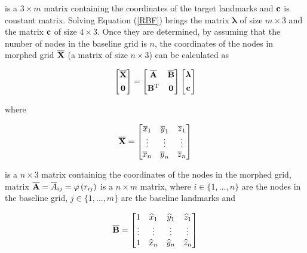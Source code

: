 is a $3\times m$ matrix containing the coordinates of the target landmarks and ${\bf c}$ is constant matrix. Solving Equation (\ref{RBF}) brings the matrix $\bm\lambda$ of size $m\times 3$ and the matrix ${\bf c}$ of size $4\times 3$. Once they are determined, by assuming that the number of nodes in the baseline grid is $n$, the coordinates of the nodes in morphed grid $\overline{\bf X}$ (a matrix of size $n\times 3$) can be calculated as

\begin{equation}
\left[\begin{matrix}
\overline{\bf X}\\[1ex]
{\bf 0}
\end{matrix}\right]
=
\left[\begin{matrix}
\overline{\bf A} & \overline{\bf B}\\[1ex]
{\bf B}^{\mathrm{T}} & {\bf 0}
\end{matrix}\right]
\left[\begin{matrix}
\bm\lambda\\[1ex]
{\bf c}
\end{matrix}\right]
\end{equation}

where

\begin{equation}
\overline{\bf X}=\left[\begin{matrix}
\overline{x}_1 & \overline{y}_1 & \overline{z}_1\\
\vdots & \vdots & \vdots\\
\overline{x}_n & \overline{y}_n & \overline{z}_n
\end{matrix}\right]
\end{equation}

is a $n\times 3$ matrix containing the coordinates of the nodes in the morphed grid, matrix $\overline{\bf A}=\overline{A}_{ij}=\varphi\left(r_{ij}\right)$ is a $n\times m$ matrix, where $i\in\{1,\dots,n\}$ are the nodes in the baseline grid, $j\in\{1,\dots,m\}$ are the baseline landmarks and

\begin{equation}
\overline{\bf B}=\left[\begin{matrix}
1 & \widehat{x}_1 & \widehat{y}_1 & \widehat{z}_1\\
\vdots & \vdots & \vdots & \vdots\\
1 & \widehat{x}_n & \widehat{y}_n & \widehat{z}_n
\end{matrix}\right]
\end{equation}

